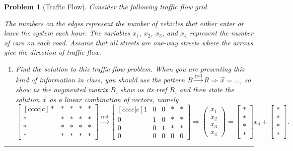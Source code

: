 \documentclass[letterpaper,oneside]{book}%
\newcommand{\midarrow}{\tikz \draw[-triangle 90] (0,0) -- +(.1,0);}
\theoremstyle{plain}
\theoremstyle{box}
\theoremstyle{problem}
\newtheorem{problemnum}{Problem}[chapter]
\newenvironment{problem}[1][]{\begin{problemnum}[#1]}{\end{problemnum}\nopagebreak\hrule\bigskip}
\newcommand{\pvec}[1]{\begin{pmatrix} #1 \end{pmatrix}}
\newcommand{\bvec}[1]{\begin{bmatrix} #1 \end{bmatrix}}
\begin{document}
\begin{problem}[Traffic Flow]
Consider the following traffic flow grid.
\begin{center}
\end{center}
The numbers on the edges represent the number of vehicles that either enter or leave the system each hour.  The variables $x_1$, $x_2$, $x_3$, and $x_4$ represent the number of cars on each road. Assume that all streets are one-way streets where the arrows give the direction of traffic flow.
\begin{enumerate}
 \item Find the solution to this traffic flow problem. When you are presenting this kind of information in class, you should use the pattern $B\xrightarrow{\text{rref}}R\Rightarrow\vec x = ...$, so show us the augmented matrix $B$, show us its rref $R$, and then state the solution $\vec x$ as a linear combination of vectors, namely
$$
\bvec{[cccc|c]*&*&*&*&*\\ *&*&*&*&*\\ *&*&*&*&*\\ *&*&*&*&*}
\xrightarrow{\text{rref}}\bvec{[cccc|c]1&0&0&*&*\\ 0&1&0&*&*\\ 0&0&1&*&*\\ 0&0&0&0&0}\Rightarrow \pvec{x_1\\x_2\\x_3\\x_4}=\bvec{*\\ *\\ *\\ * }x_4+\bvec{*\\ *\\ *\\ * }.$$


\end{enumerate}
\end{problem}
\end{document}
